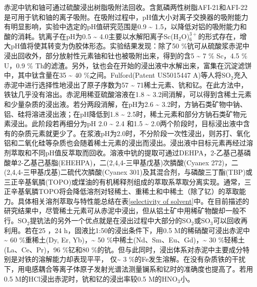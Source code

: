赤泥中钪和铀可通过硫酸浸出树脂吸附法回收\cite{smirnov1997investigation}。含氮磷两性树脂AFI-21和AFI-22是可用于钪和铀的离子吸附。在吸附过程中，pH值大小对离子交换器的吸附能力有明显影响，实验中选定的pH值研究范围是0.9 \textasciitilde{ }1.5，以降低对铝的吸附能力和酸的消耗。钪离子在pH为0.5 \textasciitilde{ }4.0主要以水解阳离子Sc(H$ _{\mathrm{2}} $O)$ _{\mathrm{6}}^{\mathrm{3+}} $的形式存在，增大pH值将使其转变为伪胶体形态。实验结果发现：除了50 \%钪可从硫酸浆赤泥中浸出回收外，部分放射性元素铀和钍也被吸附出来，得到的含5 \textasciitilde{ }7 \% Sc，4.5 \% U，0.9 \% Th的滤渣。另外，钛也会在开始的浸出液中水解出来，富集在沉淀滤饼中，其中钛含量在35 \textasciitilde{ }40 \%之间。Fulford(Patent US5015447 A)等人将SO$ _{\mathrm{2}} $充入赤泥中进行选择性地浸出了原子序数为57 \textasciitilde{ }71稀土元素、钪和钇。在此方法中，铁钛几乎没有溶出。赤泥用稀亚硫酸溶液在1.8 \textasciitilde{ }3.2间消解，可以得到含稀土元素和少量杂质的浸出液。若分两段消解，在pH为2.6 \textasciitilde{ }3.2时，方钠石类矿物中钠、铝、硅将溶进浸出液；在pH降低到1.8 \textasciitilde{ }2.5时，稀土元素和部分方钠石类矿物元素浸出。此阶段若再细分为pH 2.0 \textasciitilde{ }2.4 和1.5 \textasciitilde{ }2.0两个阶段时，目标浸出液中含有的杂质元素就更少了。在浆液pH为2.0时，不分阶段一次性浸出，则苏打、氧化铝和二氧化硅等杂质也会随着稀土元素的浸出而浸出。浸出液中目标元素再经过溶剂萃取和不同pH值反萃取而回收。溶液中钪的提取可通过DEHPA，2-乙基己基磷酸单2-乙基己基脂(EHEHPA)，二(2,4,4-三甲基戊基)次膦酸(Cyanex 272)，二(2,4,4-三甲基戊基)二硫代次膦酸(Cyanex 301)及其混合剂，与磷酸三丁酯(TBP)或三正辛基氧膦(TOPO)或煤油的有机稀释剂组成的萃取系萃取分离实现。通常，三正辛基氧膦TOPO将会降低溶剂对轻稀土、重稀土和中稀土（除了钇）的萃取能力。具体相关溶剂萃取与特性能总结在表\ref{selectivity of solvent}中\cite{wang2011separation,Recovery1989}。在目前描述的研究结果中，尽管稀土元素可从赤泥中浸出，但从铝土矿中用稀矿物酸却一般不行。SO$ _{\mathrm{2}} $提钪法的另外一个优点就是在浸出过程中大部分的SO$ _{\mathrm{2}} $或SO$ _{\mathrm{3}} $可以回收再利用。若在25 \textcelsius，24 h，固液比1:50的浸出条件下，用0.5 M的稀硝酸可浸出赤泥中 \textasciitilde{ }60 \%重稀土(Dy, Er, Yb)，\textasciitilde{ }50 \%中稀土(Nd、Sm、Eu、Gd)，\textasciitilde{ }30 \%轻稀土(La、Ce、Pr)，96 \%钇和80 \%的钪\cite{ochsenkuhn1996recovery}。但与此同时，浸出体系对赤泥中主要成分特别是对铁的溶解能力却表现平平， 仅\textasciitilde{ }3 \%的Fe发生溶解。在没有杂质铁的干扰下，用电感耦合等离子体原子发射光谱法测量镧系和钇时的准确度也提高了。若用0.5 M的HCl浸出赤泥时，钪和钇的浸出率较0.5 M的HNO$ _{\mathrm{3}} $小。

